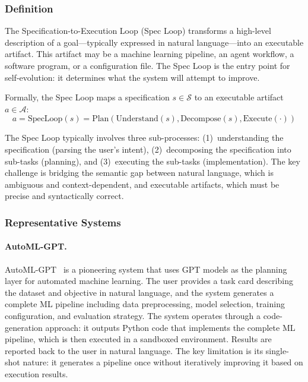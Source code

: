 \subsubsection{Definition}

The Specification-to-Execution Loop (Spec Loop) transforms a high-level description of a goal---typically expressed in natural language---into an executable artifact. This artifact may be a machine learning pipeline, an agent workflow, a software program, or a configuration file. The Spec Loop is the entry point for self-evolution: it determines what the system will attempt to improve.

Formally, the Spec Loop maps a specification $s \in \mathcal{S}$ to an executable artifact $a \in \mathcal{A}$:
\begin{equation}
    a = \text{SpecLoop}(s) = \text{Plan}(\text{Understand}(s), \text{Decompose}(s), \text{Execute}(\cdot))
\end{equation}

The Spec Loop typically involves three sub-processes: (1)~understanding the specification (parsing the user's intent), (2)~decomposing the specification into sub-tasks (planning), and (3)~executing the sub-tasks (implementation). The key challenge is bridging the semantic gap between natural language, which is ambiguous and context-dependent, and executable artifacts, which must be precise and syntactically correct.

\subsubsection{Representative Systems}

\paragraph{AutoML-GPT.}
AutoML-GPT~\citep{zhang2023automlgpt} is a pioneering system that uses GPT models as the planning layer for automated machine learning. The user provides a task card describing the dataset and objective in natural language, and the system generates a complete ML pipeline including data preprocessing, model selection, training configuration, and evaluation strategy. The system operates through a code-generation approach: it outputs Python code that implements the complete ML pipeline, which is then executed in a sandboxed environment. Results are reported back to the user in natural language. The key limitation is its single-shot nature: it generates a pipeline once without iteratively improving it based on execution results.

